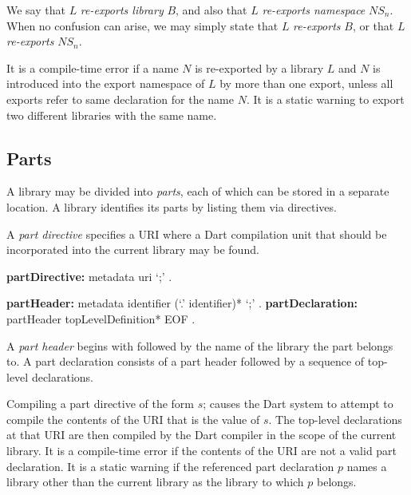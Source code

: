 \documentclass{article}
\newcommand{\code}[1]{{\sf #1}}
\begin{document}

\LMHash{}
We say that $L$ {\em re-exports library } $B$, and also that $L$ {\em re-exports namespace } $NS_n$. When no confusion can arise, we may simply state that $L$ {\em re-exports }$B$, or that $L$ {\em re-exports }$NS_n$.

\LMHash{}
It is a compile-time error if a name $N$ is re-exported by a library $L$ and $N$ is  introduced into the export namespace of $L$ by more than one export, unless all  exports refer to same declaration for the name $N$.  It is a static warning to export two different libraries with the same name.



\subsection{Parts}

\LMHash{}
A library may be divided into {\em parts}, each of which can be stored in a separate location. A library identifies its parts by listing them via \PART{} directives. 

\LMHash{}
A {\em part directive} specifies a URI where a Dart compilation unit that should be incorporated into the current library may be found.

\begin{grammar}
{\bf partDirective:}
   metadata \PART{}   uri `{\escapegrammar ;}' 
    .

{\bf partHeader:}
      metadata \PART{} \OF{} identifier (`{\escapegrammar .}' identifier)* `{\escapegrammar ;}'
    .
{\bf partDeclaration:}
      partHeader topLevelDefinition* EOF
    .
\end{grammar}

\LMHash{}
A {\em part header} begins with  \PART{} \OF{}  followed by the name of the library the part belongs to.  A part declaration consists of a part header followed by a sequence of top-level declarations.

\LMHash{}
Compiling a part directive of the form \code{\PART{} $s$;} causes the Dart system to attempt to compile the contents of the URI that is the value of $s$. The top-level declarations at that URI are then compiled by the Dart compiler in the scope of the current library. It is a compile-time error if the contents of the URI are not a valid part declaration. It is a static warning if the referenced part declaration $p$ names a library other than the current library as the library to which $p$ belongs.
\end{document}
